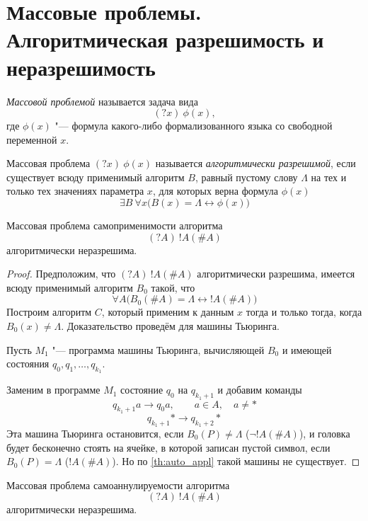 \section{Массовые проблемы. Алгоритмическая разрешимость и не\tpst{\-}{}разрешимость}

\begin{definition}
	\emph{Массовой проблемой} называется задача вида
	$$ (?x)~\phi(x), $$
	где $ \phi(x) $ "--- формула какого-либо формализованного языка со свободной переменной $ x $.
\end{definition}

\begin{definition}
	Массовая проблема $ (?x)~\phi(x) $ называется \emph{алгоритмически разрешимой}, если существует всюду применимый алгоритм $ B $, равный пустому слову $ \Lambda $ на тех и только тех значениях параметра $ x $, для которых верна формула $ \phi(x) $
	$$ \exists B ~\forall x \bigl( B(x) = \Lambda \leftrightarrow \phi(x) \bigr) $$
\end{definition}

\begin{theorem}
	Массовая проблема самоприменимости алгоритма
	$$ (?A)~!A(\#A) $$
	алгоритмически неразрешима.
\end{theorem}

\begin{proof}
	Предположим, что $ (?A)~!A(\#A) $ алгоритмически разрешима, \ie имеется всюду применимый алгоритм $ B_0 $ такой, что
	$$ \forall A \bigl( B_0(\#A) = \Lambda \leftrightarrow !A(\#A) \bigr) $$
	Построим алгоритм $ C $, который применим к данным $ x $ тогда и только тогда, когда $ B_0(x) \ne \Lambda $.
	Доказательство проведём для машины Тьюринга.

	Пусть $ M_1 $ "--- программа машины Тьюринга, вычисляющей $ B_0 $ и имеющей состояния $ q_0, q_1, \dots, q_{k_1} $.

	Заменим в программе $ M_1 $ состояние $ q_0 $ на $ q_{k_1 + 1} $ и добавим команды
	$$ q_{k_1 + 1}a \to q_0 a, \qquad a \in A, \quad a \ne * $$
	$$ q_{k_1 + 1}* \to q_{k_1 + 2}* $$
	Эта машина Тьюринга остановится, если $ B_0(P) \ne \Lambda $ (\ie $ \neg !A(\#A) $), и головка будет бесконечно стоять на ячейке, в которой записан пустой символ, если $ B_0(P) = \Lambda $ (\ie $ !A(\#A) $).
	Но по \autoref{th:auto_appl} такой машины не существует.
\end{proof}

\begin{theorem}
	Массовая проблема самоаннулируемости алгоритма
	$$ (?A)~!A(\#A) $$
	алгоритмически неразрешима.
\end{theorem}


